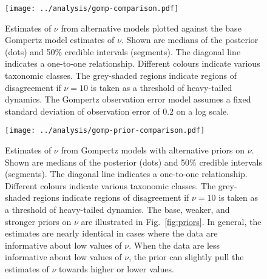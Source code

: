 \begin{figure}[htbp]
\begin{center}
\texttt{[image: ../analysis/gomp-comparison.pdf]}

\caption[Estimates of $\nu$ from alternative models plotted against the base
Gompertz model estimates of $\nu$.]{Estimates of $\nu$ from alternative models
  plotted against the base Gompertz model estimates of $\nu$. Shown are
  medians of the posterior (dots) and 50\% credible intervals (segments). The
  diagonal line indicates a one-to-one relationship. Different colours
  indicate various taxonomic classes. The grey-shaded regions indicate regions
  of disagreement if $\nu = 10$ is taken as a threshold of heavy-tailed
  dynamics. The Gompertz observation error model assumes a fixed standard
  deviation of observation error of $0.2$ on a log scale.}

\label{fig:alt}
\end{center}
\end{figure}

\clearpage

\begin{figure}[htbp]
\begin{center}
\texttt{[image: ../analysis/gomp-prior-comparison.pdf]}

\caption[Estimates of $\nu$ from Gompertz models with alternative priors on
$\nu$.]{Estimates of $\nu$ from Gompertz models with alternative priors on
  $\nu$. Shown are medians of the posterior (dots) and 50\% credible intervals
  (segments). The diagonal line indicates a one-to-one relationship. Different
  colours indicate various taxonomic classes. The grey-shaded regions indicate
  regions of disagreement if $\nu = 10$ is taken as a threshold of
  heavy-tailed dynamics. The base, weaker, and stronger priors on $\nu$ are
  illustrated in Fig.~\ref{fig:priors}. In general, the estimates are nearly
  identical in cases where the data are informative about low values of $\nu$.
  When the data are less informative about low values of $\nu$, the prior can
  slightly pull the estimates of $\nu$ towards higher or lower values.}

\label{fig:alt-priors}
\end{center}
\end{figure}

\clearpage

